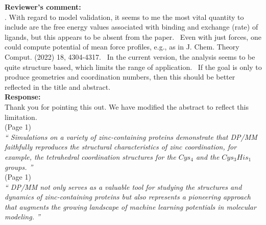 \documentclass[doublespace,prb,aps,preprint]{revtex4}
\newcommand{\Quote}[1]{\textsl{``#1''}}
\newenvironment{Comment}{ {\bf \indent Reviewer's comment: \\} \setlength{\parindent}{1cm}  \sffamily }{ \ignorespacesafterend \\}
\newenvironment{Reply}{  {\bf Response: \\}  \setlength{\parindent}{1cm} \normalfont }{ \ignorespacesafterend \vspace{5mm}}
\newcommand{\HJ}[1]{\textcolor{red}{#1}}
\begin{document}
\begin{Comment}
3. With regard to model validation, it seems to me the most vital quantity to include are the free energy values associated with binding and exchange (rate) of ligands, 
but this appears to be absent from the paper.  
Even with just forces, one could compute potential of mean force profiles, e.g., as in J. Chem. Theory Comput. (2022) 18, 4304-4317.  
In the current version, the analysis seems to be quite structure based, which limits the range of application. 
If the goal is only to produce geometries and coordination numbers, then this should be better reflected in the title and abstract.
\end{Comment}
\begin{Reply}
    Thank you for pointing this out. We have modified the abstract to reflect this limitation.  \\
    \newline
    (Page 1) \\
    \Quote{
        Simulations on a variety of zinc-containing proteins demonstrate that DP/MM faithfully reproduces the structural characteristics of zinc coordination, 
        for example, the tetrahedral coordination structures for the $Cys_4$ and the $Cys_3His_1$ groups. 
    } \\
    (Page 1) \\
    \Quote{
        DP/MM not only serves as a valuable tool for studying the structures and dynamics of zinc-containing proteins but also represents a pioneering approach that augments the growing landscape of machine learning potentials in molecular modeling.
    }

\end{Reply}
\end{document}
